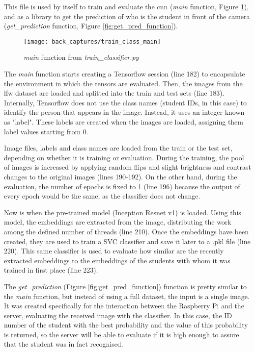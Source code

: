 	This file is used by itself to train and evaluate the \gls{cnn} (\textit{main} function, Figure \ref{fig:train_classifier_main}), and as a library to get the prediction of who is the student in front of the camera (\textit{get{\_}prediction} function, Figure \ref{fig:get_pred_function}). 

	\begin{figure}[!ht]
		\centering
		\texttt{[image: back\_captures/train\_class\_main]}
		\caption{\textit{main} function from \textit{train{\_}classifier.py}}
		\label{fig:train_classifier_main}
	\end{figure}

	The \textit{main} function starts creating a Tensorflow session (line 182) to encapsulate the environment in which the tensors are evaluated. Then, the images from the \gls{lfw} dataset are loaded and splitted into the train and test sets (line 183). Internally, Tensorflow does not use the class names (student IDs, in this case) to identify the person that appears in the image. Instead, it uses an integer known as "label". These labels are created when the images are loaded, assigning them label values starting from 0.  

	Image files, labels and class names are loaded from the train or the test set, depending on whether it is training or evaluation. During the training, the pool of images is increased by applying random flips and slight brightness and contrast changes to the original images (lines 190-192). On the other hand, during the evaluation, the number of \glspl{epoch} is fixed to 1 (line 196) because the output of every epoch would be the same, as the classifier does not change.

	Now is when the pre-trained model (Inception Resnet v1) is loaded. Using this model, the \glspl{embedding} are extracted from the image, distributing the work among the defined number of threads (line 210). Once the embeddings have been created, they are used to train a SVC classifier and save it later to a .pkl file (line 220). This same classifier is used to evaluate how similar are the recently extracted embeddings to the embeddings of the students with whom it was trained in first place (line 223).

	The \textit{get{\_}prediction} (Figure \ref{fig:get_pred_function}) function is pretty similar to the \textit{main} function, but instead of using a full dataset, the input is a single image. It was created specifically for the interaction between the Raspberry Pi and the server, evaluating the received image with the classifier. In this case, the ID number of the student with the best probability and the value of this probability is returned, so the server will be able to evaluate if it is high enough to assure that the student was in fact recognised.

